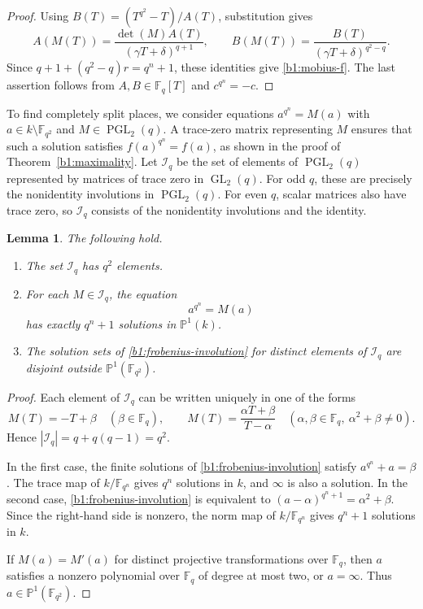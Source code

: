 \documentclass[12pt,reqno]{amsart}
\numberwithin{equation}{section}
\newcommand{\F}{\mathbb F}
\newcommand{\PP}{\mathbb P}
\DeclareMathOperator{\GL}{GL}
\DeclareMathOperator{\PGL}{PGL}
\theoremstyle{plain}
\newtheorem{lemma}[theorem]{Lemma}
\theoremstyle{definition}
\theoremstyle{remark}
\begin{document}
\begin{proof}
Using \(B(T)=(T^{q^2}-T)/A(T)\), substitution gives
\[
 A(M(T))=\frac{\det(M)A(T)}{(\gamma T+\delta)^{q+1}},\qquad
 B(M(T))=\frac{B(T)}{(\gamma T+\delta)^{q^2-q}}.
\]
Since \(q+1+(q^2-q)r=q^n+1\), these identities give
\eqref{b1:mobius-f}.  The last assertion follows from
\(A,B\in\F_q[T]\) and \(c^{q^n}=-c\).
\end{proof}

To find completely split places, we consider equations
\(a^{q^n}=M(a)\) with \(a\in k\setminus\F_{q^2}\) and
\(M\in\PGL_2(q)\). A trace-zero matrix representing \(M\) ensures
that such a solution satisfies \(f(a)^{q^n}=f(a)\), as shown in the
proof of Theorem~\ref{b1:maximality}.
Let \(\mathcal I_q\) be the set of elements of \(\PGL_2(q)\)
represented by matrices of trace zero in \(\GL_2(q)\).
For odd \(q\), these are precisely
the nonidentity involutions in \(\PGL_2(q)\). For even \(q\), scalar
matrices also have trace zero, so \(\mathcal I_q\) consists of the
nonidentity involutions and the identity.

\begin{lemma}
\label{b1:involution-solutions}
The following hold.
\begin{enumerate}
\item\label{b1:involution-cardinality}
The set \(\mathcal I_q\) has \(q^2\) elements.
\item\label{b1:involution-root-count}
For each
\(M\in\mathcal I_q\), the equation
\begin{equation}
\label{b1:frobenius-involution}
 a^{q^n}=M(a)
\end{equation}
has exactly \(q^n+1\) solutions in \(\PP^1(k)\).
\item\label{b1:involution-disjointness}
The solution sets of \eqref{b1:frobenius-involution} for
distinct elements of \(\mathcal I_q\) are disjoint outside
\(\PP^1(\F_{q^2})\).
\end{enumerate}
\end{lemma}

\begin{proof}
Each element of \(\mathcal I_q\) can be written uniquely in one of the forms
\[
 M(T)=-T+\beta\quad(\beta\in\F_q),\qquad
 M(T)=\frac{\alpha T+\beta}{T-\alpha}
 \quad(\alpha,\beta\in\F_q,\ \alpha^2+\beta\ne0).
\]
Hence \(|\mathcal I_q|=q+q(q-1)=q^2\).

In the first case, the finite solutions of
\eqref{b1:frobenius-involution} satisfy \(a^{q^n}+a=\beta\).
The trace map of \(k/\F_{q^n}\) gives \(q^n\) solutions in \(k\),
and \(\infty\) is also a solution.
In the second case, \eqref{b1:frobenius-involution} is equivalent to
\((a-\alpha)^{q^n+1}=\alpha^2+\beta\).
Since the right-hand side is nonzero, the norm map of
\(k/\F_{q^n}\) gives \(q^n+1\) solutions in \(k\).

If \(M(a)=M'(a)\) for distinct projective transformations over
\(\F_q\), then \(a\) satisfies a nonzero polynomial over \(\F_q\)
of degree at most two, or \(a=\infty\).  Thus
\(a\in\PP^1(\F_{q^2})\).
\end{proof}
\end{document}
